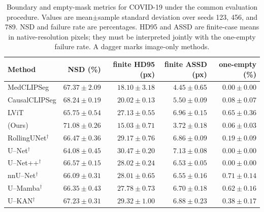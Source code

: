 \begin{table}[htbp]
\centering
\caption{Boundary and empty-mask metrics for COVID-19 under the common evaluation procedure. Values are mean$\pm$sample standard deviation over seeds 123, 456, and 789. NSD and failure rate are percentages. HD95 and ASSD are finite-case means in native-resolution pixels; they must be interpreted jointly with the one-empty failure rate. A dagger marks image-only methods.}
\label{tab:supp_boundary_medclipseg_covid19}
\footnotesize
\setlength{\tabcolsep}{4.0pt}
\begin{tabular}{@{}lrrrr@{}}
\toprule
Method & NSD (\%) & finite HD95 (px) & finite ASSD (px) & one-empty (\%) \\
\midrule
MedCLIPSeg & $67.37\pm2.09$ & $18.10\pm3.18$ & $4.45\pm0.65$ & $0.00\pm0.00$ \\
CausalCLIPSeg & $68.24\pm0.19$ & $20.02\pm0.13$ & $5.50\pm0.09$ & $0.08\pm0.07$ \\
LViT & $65.75\pm0.54$ & $27.13\pm0.55$ & $6.96\pm0.15$ & $0.65\pm0.36$ \\
\methodname{} (Ours) & $71.08\pm0.26$ & $15.03\pm0.71$ & $3.72\pm0.18$ & $0.06\pm0.03$ \\
RollingUNet$^\dagger$ & $66.47\pm0.36$ & $29.17\pm0.76$ & $6.86\pm0.09$ & $0.19\pm0.09$ \\
U--Net$^\dagger$ & $64.08\pm0.45$ & $30.47\pm0.20$ & $7.13\pm0.08$ & $0.00\pm0.00$ \\
U--Net++$^\dagger$ & $66.57\pm0.15$ & $28.02\pm0.24$ & $6.53\pm0.05$ & $0.00\pm0.00$ \\
nnU--Net$^\dagger$ & $66.09\pm0.31$ & $28.01\pm0.65$ & $6.55\pm0.16$ & $0.71\pm0.14$ \\
U--Mamba$^\dagger$ & $66.35\pm0.43$ & $27.78\pm0.73$ & $6.70\pm0.18$ & $0.62\pm0.16$ \\
U--KAN$^\dagger$ & $67.23\pm0.31$ & $29.32\pm1.00$ & $6.88\pm0.23$ & $0.38\pm0.17$ \\
\bottomrule
\end{tabular}
\end{table}
